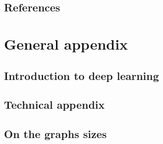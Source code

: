 \begin{fullwidth}
    \chapter*{References}
    
    
    
    
    \appendix
    \part[GENERAL APPENDIX]{General appendix}
    
    \chapter[INTRODUCTION TO DEEP LEARNING]{Introduction to deep learning}
    \label{chap:61}
\end{fullwidth}



\begin{fullwidth}
    \part[TECHNICAL APPENDIX]{Technical appendix}
    
    \chapter[ON THE GRAPHS SIZES]{On the graphs sizes}
    \label{chap:62}
\end{fullwidth}

